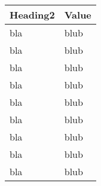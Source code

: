 \begin{tabular}[t]{ll}
\hline
Heading2 & Value \\
\hline
bla & blub \\
bla & blub \\
bla & blub \\
bla & blub \\
bla & blub \\
bla & blub \\
bla & blub \\
bla & blub \\
bla & blub \\
\end{tabular}